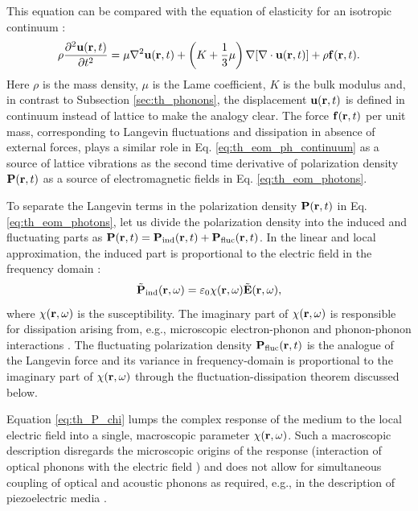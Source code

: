 This equation can be compared with the equation of elasticity for an isotropic continuum \cite{fetter}:
\begin{equation}
  \rho \frac{\partial^2 \mathbf{u}(\mathbf{r},t)}{\partial t^2} = \mu \nabla^2 \mathbf{u}(\mathbf{r},t) + \left(K+\frac{1}{3}\mu \right) \nabla[\nabla \cdot \mathbf{u}(\mathbf{r},t)] + \rho \mathbf{f}(\mathbf{r},t). \label{eq:th_eom_ph_continuum}
\end{equation}
Here $\rho$ is the mass density, $\mu$ is the Lame coefficient, $K$ is the bulk modulus and, in contrast to Subsection \ref{sec:th_phonons}, the displacement $\mathbf{u}(\mathbf{r},t)$ is defined in continuum instead of lattice to make the analogy clear. The force $\mathbf{f}(\mathbf{r},t)$ per unit mass, corresponding to Langevin fluctuations and dissipation in absence of external forces, plays a similar role in Eq. \eqref{eq:th_eom_ph_continuum} as a source of lattice vibrations as the second time derivative of polarization density $\mathbf{P}(\mathbf{r},t)$ as a source of electromagnetic fields in Eq. \eqref{eq:th_eom_photons}.

To separate the Langevin terms in the polarization density $\mathbf{P}(\mathbf{r},t)$ in Eq. \eqref{eq:th_eom_photons}, let us divide the polarization density into the induced and fluctuating parts as $\mathbf{P}(\mathbf{r},t)=\mathbf{P}_{\textrm{ind}}(\mathbf{r},t)+ \mathbf{P}_{\textrm{fluc}}(\mathbf{r},t)$. In the linear and local approximation, the induced part is proportional to the electric field in the frequency domain \cite{novotny}:
\begin{equation}
 \tilde{\mathbf{P}}_{\textrm{ind}}(\mathbf{r},\omega)= \varepsilon_0 \chi(\mathbf{r},\omega) \tilde{\mathbf{E}}(\mathbf{r},\omega), \label{eq:th_P_chi}
\end{equation}
where $\chi(\mathbf{r},\omega)$ is the susceptibility. The imaginary part of $\chi(\mathbf{r},\omega)$ is responsible for dissipation arising from, e.g., microscopic electron-phonon and phonon-phonon interactions \cite{}. The fluctuating polarization density $\mathbf{P}_{\textrm{fluc}}(\mathbf{r},t)$ is the analogue of the Langevin force and its variance in frequency-domain is proportional to the imaginary part of $\chi(\mathbf{r},\omega)$ through the fluctuation-dissipation theorem discussed below.

Equation \eqref{eq:th_P_chi} lumps the complex response of the medium to the local electric field into a single, macroscopic parameter $\chi(\mathbf{r},\omega)$. Such a macroscopic description disregards the microscopic origins of the response (interaction of optical phonons with the electric field \cite{bornhuang}) and does not allow for simultaneous coupling of optical and acoustic phonons as required, e.g., in the description of piezoelectric media \cite{}. 


